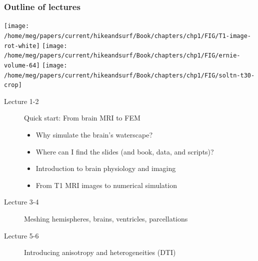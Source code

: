 \documentclass[mathserif, aspectratio=169]{beamer}
\begin{document}

\begin{frame}
  \frametitle{Outline of lectures}
  \begin{center}
  \texttt{[image: /home/meg/papers/current/hikeandsurf/Book/chapters/chp1/FIG/T1-image-rot-white]}
  \texttt{[image: /home/meg/papers/current/hikeandsurf/Book/chapters/chp1/FIG/ernie-volume-64]}
  \texttt{[image: /home/meg/papers/current/hikeandsurf/Book/chapters/chp1/FIG/soltn-t30-crop]}
  \end{center}
  \begin{description}
    \item[Lecture 1-2] Quick start: From brain MRI to FEM
      \begin{itemize}
      \item
        Why simulate the brain's waterscape?
      \item
        Where can I find the slides (and book, data, and scripts)?
      \item
        Introduction to brain physiology and imaging
      \item
        From T1 MRI images to numerical simulation
      \end{itemize}
    \item[Lecture 3-4] Meshing hemispheres, brains, ventricles, parcellations
    \item[Lecture 5-6] Introducing anisotropy and heterogeneities (DTI)
  \end{description}
\end{frame}
\end{document}

